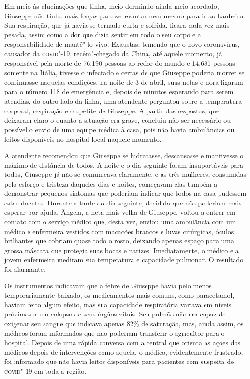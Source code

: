 Em meio às alucinações que tinha, meio dormindo ainda meio acordado,
Giuseppe não tinha mais forças para se levantar nem mesmo para ir ao
banheiro. Sua respiração, que já havia se tornado curta e sofrida,
ficara cada vez mais pesada, assim como a dor que dizia sentir em todo o
seu corpo e a responsabilidade de mantê"-lo vivo. Exaustas, temendo que o
novo coronavírus, causador da \textsc{covid}"-19, recém"-chegado da China, até
aquele momento, já responsável pela morte de 76.190 pessoas ao redor do
mundo e 14.681 pessoas somente na Itália, tivesse o infectado e certas
de que Giuseppe poderia morrer se continuasse naquelas condições, na
noite de 3 de abril, suas netas e nora ligaram para o número 118 de
emergência e, depois de minutos esperando para serem atendias, do outro
lado da linha, uma atendente perguntou sobre a temperatura corporal,
respiração e o apetite de Giuseppe. A partir das respostas, que deixaram
claro o quanto a situação era grave, concluiu não ser necessário ou
possível o envio de uma equipe médica à casa, pois não havia ambulâncias
ou leitos disponíveis no hospital local naquele momento.

A atendente recomendou que Giuseppe se hidratasse, descansasse e
mantivesse o máximo de distância de todos. A noite e o dia seguinte
foram insuportáveis para todos, Giuseppe já não se comunicava
claramente, e as três mulheres, consumidas pelo esforço e tristeza
daqueles dias e noites, começavam elas também a demonstrar pequenos
sintomas que poderiam indicar que todos na casa pudessem estar doentes.
Durante a tarde do dia seguinte, decidida que não poderiam mais esperar
por ajuda, Ângela, a neta mais velha de Giuseppe, voltou a entrar em
contato com o serviço médico que, desta vez, enviou uma ambulância com
um médico e enfermeira vestidos com macacões brancos e luvas cirúrgicas,
óculos brilhantes que cobriam quase todo o rosto, deixando apenas espaço
para uma grossa máscara que protegia suas bocas e narizes.
Imediatamente, o médico e a jovem enfermeira mediram sua temperatura e
capacidade pulmonar. O resultado foi alarmante.

Os instrumentos indicavam que a febre de Giuseppe havia pelo menos
temporariamente baixado, os medicamentos mais comuns, como paracetamol,
haviam feito algum efeito, mas sua capacidade respiratória variava em
níveis próximos a um colapso de seus órgãos vitais. Seu pulmão não era
capaz de oxigenar seu sangue que indicava apenas 82\% de saturação, mas,
ainda assim, os médicos foram informados que não poderiam transferir o
agricultor para o hospital. Depois de uma rápida conversa com a central
que orienta as ações dos médicos depois de intervenções como aquela, o
médico, evidentemente frustrado, foi informado que não havia leitos
disponíveis para pacientes com suspeita de \textsc{covid}"-19 em toda a região.

